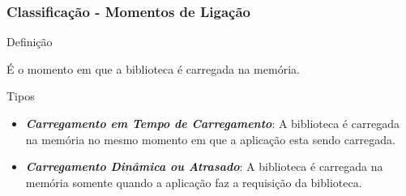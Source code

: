 \begin{frame}
 \frametitle{Classificação - Momentos de Ligação}
 
 \begin{block}{Definição}  
 
  É o momento em que a biblioteca é carregada na memória.
  
 \end{block}

 \begin{block}{Tipos}  
 
  \begin{itemize}
  
   \item \emph{\textbf{Carregamento em Tempo de Carregamento}}: A biblioteca é carregada na memória no mesmo 
   momento em que a aplicação esta sendo carregada.
   
   \item \emph{\textbf{Carregamento Dinâmica ou Atrasado}}: A biblioteca é carregada na memória somente quando 
   a aplicação faz a requisição da biblioteca.
   
  \end{itemize}

 \end{block}
 
\end{frame}

